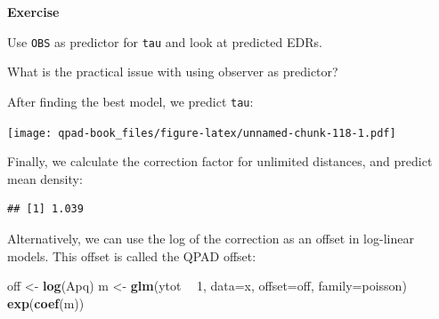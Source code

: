 \documentclass[12pt,]{book}
\newenvironment{Shaded}{\begin{snugshade}}{\end{snugshade}}
\newcommand{\DataTypeTok}[1]{\textcolor[rgb]{0.13,0.29,0.53}{#1}}
\newcommand{\DecValTok}[1]{\textcolor[rgb]{0.00,0.00,0.81}{#1}}
\newcommand{\KeywordTok}[1]{\textcolor[rgb]{0.13,0.29,0.53}{\textbf{#1}}}
\newcommand{\NormalTok}[1]{#1}
\newcommand{\OperatorTok}[1]{\textcolor[rgb]{0.81,0.36,0.00}{\textbf{#1}}}
\newcommand{\StringTok}[1]{\textcolor[rgb]{0.31,0.60,0.02}{#1}}
\let\BeginKnitrBlock\begin \let\EndKnitrBlock\end
\begin{document}
\BeginKnitrBlock{rmdexercise}
\textbf{Exercise}

Use \texttt{OBS} as predictor for \texttt{tau} and look at predicted EDRs.

What is the practical issue with using observer as predictor?
\EndKnitrBlock{rmdexercise}

After finding the best model, we predict \texttt{tau}:

\begin{Shaded}
\end{Shaded}

\texttt{[image: qpad-book\_files/figure-latex/unnamed-chunk-118-1.pdf]}

Finally, we calculate the correction factor for unlimited distances,
and predict mean density:

\begin{Shaded}
\end{Shaded}

\begin{verbatim}
## [1] 1.039
\end{verbatim}

Alternatively, we can use the log of the correction
as an offset in log-linear models. This offset is
called the QPAD offset:

\begin{Shaded}
\begin{Highlighting}[]
\NormalTok{off <-}\StringTok{ }\KeywordTok{log}\NormalTok{(Apq)}
\NormalTok{m <-}\StringTok{ }\KeywordTok{glm}\NormalTok{(ytot }\OperatorTok{~}\StringTok{ }\DecValTok{1}\NormalTok{, }\DataTypeTok{data=}\NormalTok{x, }\DataTypeTok{offset=}\NormalTok{off, }\DataTypeTok{family=}\NormalTok{poisson)}
\KeywordTok{exp}\NormalTok{(}\KeywordTok{coef}\NormalTok{(m))}
\end{Highlighting}
\end{Shaded}
\end{document}
